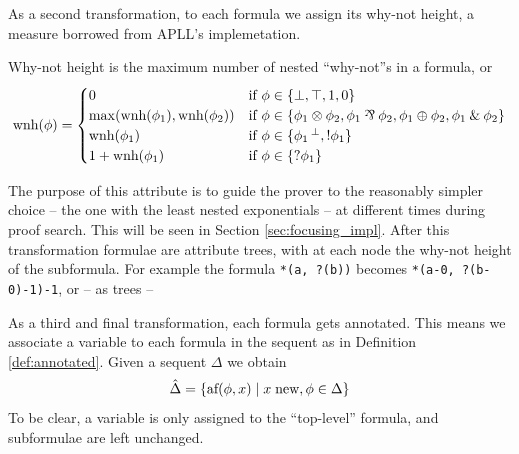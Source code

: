 \documentclass[a4paper, 12pt, english]{report}
\begin{document}
As a second transformation, to each formula we assign its why-not height, a measure borrowed from APLL's implemetation.
\begin{define}
	\label{def:why-not-height}
	Why-not height is the maximum number of nested ``why-not''s in a formula, or
	$$ \text{wnh}(\phi) = 
	\begin{cases}	
		0 & \text{if }\phi \in \{\llbot, \lltop, \llone, \llzero\} \\
		\max(\text{wnh}(\phi_1), \text{wnh}(\phi_2)) & \text{if } \phi \in \{ \phi_1 \llten \phi_2, \phi_1 \llpar \phi_2, \phi_1 \llplus \phi_2, \phi_1 \llwith \phi_2 \} \\
		\text{wnh}(\phi_1) & \text{if }\phi \in \{ \llnot{\phi_1}, \llbang{\phi_1}\} \\
		1 + \text{wnh}(\phi_1) & \text{if }\phi \in \{ \llwn{\phi_1} \} 
	\end{cases}
	$$
\end{define}
The purpose of this attribute is to guide the prover to the reasonably simpler choice -- the one with the least nested exponentials -- at different times during proof search.
This will be seen in Section \ref{sec:focusing_impl}.
After this transformation formulae are attribute trees, with at each node the why-not height of the subformula.
For example the formula \texttt{*(a, ?(b))} becomes \texttt{*(a-0, ?(b-0)-1)-1}, or -- as trees --
\begin{figure}[H]
	\centering
\end{figure}

As a third and final transformation, each formula gets annotated.
This means we associate a variable to each formula in the sequent as in Definition \ref{def:annotated}.
Given a sequent $\Delta$ we obtain
$$ \hat{\Delta} = \{ \text{af}(\phi, x) \mid x \; \text{new}, \phi \in \Delta \} $$
To be clear, a variable is only assigned to the ``top-level'' formula, and subformulae are left unchanged.
\end{document}
